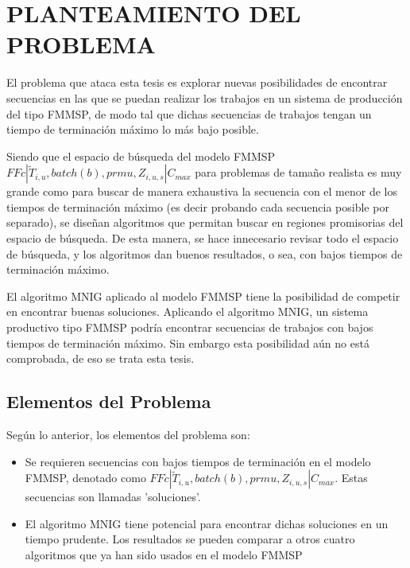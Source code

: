 \documentclass{article}
\def\notac_modelo{$FFc | \tilde{T}_{i, u}, batch(b), prmu, Z_{i, u, s} | C_{max}$}
\begin{document}
\section{PLANTEAMIENTO DEL PROBLEMA}

El problema que ataca esta tesis es explorar nuevas posibilidades de encontrar secuencias en las que se puedan realizar los trabajos en un sistema de producción del tipo FMMSP, de modo tal que dichas secuencias de trabajos tengan un tiempo de terminación máximo lo más bajo posible.

\vspace{\baselineskip}
Siendo que el espacio de búsqueda del modelo FMMSP \linebreak \notac_modelo para problemas de tamaño realista es muy grande como para buscar de manera exhaustiva la secuencia con el menor de los tiempos de terminación máximo (es decir probando cada secuencia posible por separado), se diseñan algoritmos que permitan buscar en regiones promisorias del espacio de búsqueda. De esta manera, se hace innecesario revisar todo el espacio de búsqueda, y los algoritmos dan buenos resultados, o sea, con bajos tiempos de terminación máximo.

\vspace{\baselineskip}
El algoritmo MNIG aplicado al modelo FMMSP tiene la posibilidad de competir en encontrar buenas soluciones. Aplicando el algoritmo MNIG, un sistema productivo tipo FMMSP podría encontrar secuencias de trabajos con bajos tiempos de terminación máximo. Sin embargo esta posibilidad aún no está comprobada, de eso se trata esta tesis.

\subsection{Elementos del Problema}

Según lo anterior, los elementos del problema son:

\vspace{\baselineskip}
\begin{itemize}
    \item[\maltese] Se requieren secuencias con bajos tiempos de terminación en el modelo FMMSP, denotado como \notac_modelo. Estas secuencias son llamadas 'soluciones'.
    \item[\maltese] El algoritmo MNIG tiene potencial para encontrar dichas soluciones en un tiempo prudente. Los resultados se pueden comparar a otros cuatro algoritmos que ya han sido usados en el modelo FMMSP
\end{itemize}
\end{document}
